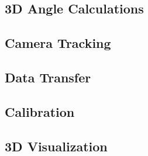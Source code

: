 \subsection{3D Angle Calculations}

\subsection{Camera Tracking}

\subsection{Data Transfer}

\subsection{Calibration}

\subsection{3D Visualization}

